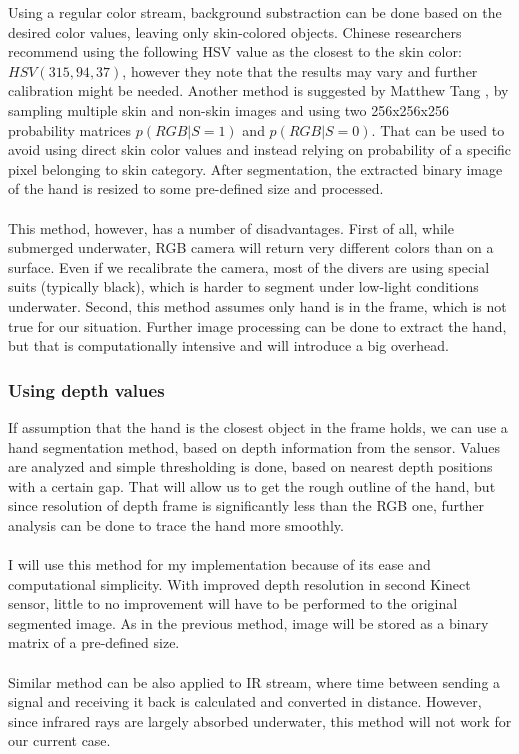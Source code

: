 \documentclass[a4paper,11pt,oneside]{article}
\begin{document}
  Using a regular color stream, background substraction can be done based on the desired color values, leaving only skin-colored objects. Chinese researchers \cite{HI01} recommend using the following HSV value as the closest to the skin color: $HSV(315, 94, 37)$, however they note that the results may vary and further calibration might be needed. Another method is suggested by Matthew Tang \cite{MT01}, by sampling multiple skin and non-skin images and using two 256x256x256 probability matrices $p(RGB|S = 1)$ and $p(RGB|S = 0)$. That can be used to avoid using direct skin color values and instead relying on probability of a specific pixel belonging to skin category. After segmentation, the extracted binary image of the hand is resized to some pre-defined size and processed.\\
  \\
  This method, however, has a number of disadvantages. First of all, while submerged underwater, RGB camera will return very different colors than on a surface. Even if we recalibrate the camera, most of the divers are using special suits (typically black), which is harder to segment under low-light conditions underwater. Second, this method assumes only hand is in the frame, which is not true for our situation. Further image processing can be done to extract the hand, but that is computationally intensive and will introduce a big overhead. 
  
  \subsubsection{Using depth values}
  
  If assumption that the hand is the closest object in the frame holds, we can use a hand segmentation method, based on depth information from the sensor. Values are analyzed and simple thresholding is done, based on nearest depth positions with a certain gap. That will allow us to get the rough outline of the hand, but since resolution of depth frame is significantly less than the RGB one, further analysis \cite{ZH01} can be done to trace the hand more smoothly.\\
  \\
  I will use this method for my implementation because of its ease and computational simplicity. With improved depth resolution in second Kinect sensor, little to no improvement will have to be performed to the original segmented image. As in the previous method, image will be stored as a binary matrix of a pre-defined size.\\
  \\
  Similar method can be also applied to IR stream, where time between sending a signal and receiving it back is calculated and converted in distance. However, since infrared rays are largely absorbed underwater, this method will not work for our current case.
  
\end{document}

